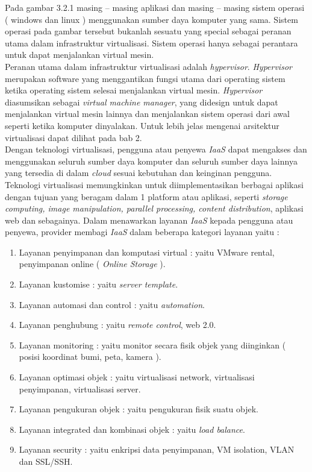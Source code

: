 Pada gambar 3.2.1 masing – masing aplikasi dan masing – masing sistem operasi ( windows dan linux ) menggunakan sumber daya komputer yang sama. Sistem operasi pada gambar tersebut bukanlah sesuatu yang special sebagai peranan utama dalam infrastruktur virtualisasi. Sistem operasi hanya sebagai perantara untuk dapat menjalankan virtual mesin.\\
\tab Peranan utama dalam infrastruktur virtualisasi adalah \textit{hypervisor}. \textit{Hypervisor} merupakan software yang menggantikan fungsi utama dari operating sistem ketika operating sistem selesai menjalankan virtual mesin. \textit{Hypervisor} diasumsikan sebagai \textit{virtual machine manager}, yang didesign untuk dapat menjalankan virtual mesin lainnya dan menjalankan sistem operasi dari awal seperti ketika komputer dinyalakan. Untuk lebih jelas mengenai arsitektur virtualisasi dapat dilihat pada bab 2.\\
\tab Dengan teknologi virtualisasi, pengguna atau penyewa \textit{IaaS} dapat mengakses dan menggunakan seluruh sumber daya komputer dan seluruh sumber daya lainnya yang tersedia di dalam \textit{cloud} sesuai kebutuhan dan keinginan pengguna.\\
\tab Teknologi virtualisasi memungkinkan untuk diimplementasikan berbagai aplikasi dengan tujuan yang beragam dalam 1 platform atau aplikasi, seperti \textit{storage computing, image manipulation, parallel processing, content distribution}, aplikasi web dan sebagainya. Dalam menawarkan layanan \textit{IaaS} kepada pengguna atau penyewa, provider membagi \textit{IaaS} dalam beberapa kategori layanan yaitu :\\
\begin{enumerate}
\item Layanan penyimpanan dan komputasi virtual : yaitu VMware rental, penyimpanan online ( \textit{Online Storage} ).
\item Layanan kustomise : yaitu \textit{server template}.
\item Layanan automasi dan control : yaitu \textit{automation}.
\item Layanan penghubung : yaitu \textit{remote control}, web 2.0.
\item Layanan monitoring : yaitu monitor secara fisik objek yang diinginkan ( posisi koordinat bumi, peta, kamera ).
\item Layanan optimasi objek : yaitu virtualisasi network, virtualisasi penyimpanan, virtualisasi server.
\item Layanan pengukuran objek : yaitu pengukuran fisik suatu objek.
\item Layanan integrated dan kombinasi objek : yaitu \textit{load balance}.
\item Layanan security : yaitu enkripsi data penyimpanan, VM isolation, VLAN dan SSL/SSH.		
\end{enumerate}
